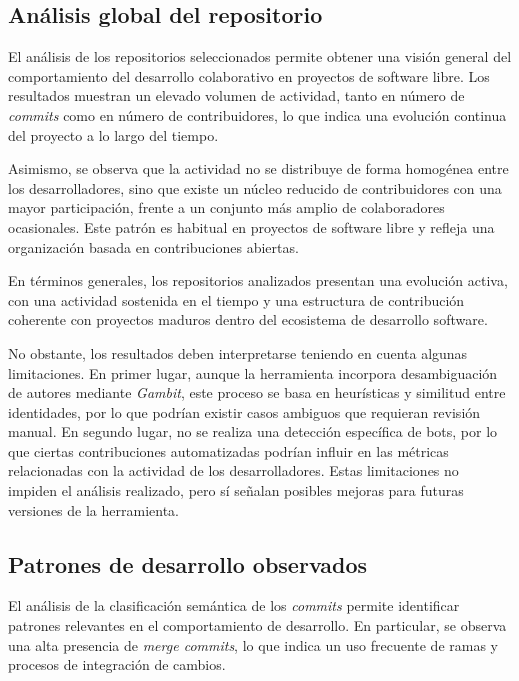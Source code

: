 \documentclass[a4paper, 12pt]{book}
\begin{document}
\subsection{Análisis global del repositorio}
\label{subsec:analisis_global}

El análisis de los repositorios seleccionados permite obtener una visión general del comportamiento del desarrollo colaborativo en proyectos de software libre. Los resultados muestran un elevado volumen de actividad, tanto en número de \emph{commits} como en número de contribuidores, lo que indica una evolución continua del proyecto a lo largo del tiempo.

Asimismo, se observa que la actividad no se distribuye de forma homogénea entre los desarrolladores, sino que existe un núcleo reducido de contribuidores con una mayor participación, frente a un conjunto más amplio de colaboradores ocasionales. Este patrón es habitual en proyectos de software libre y refleja una organización basada en contribuciones abiertas.

En términos generales, los repositorios analizados presentan una evolución activa, con una actividad sostenida en el tiempo y una estructura de contribución coherente con proyectos maduros dentro del ecosistema de desarrollo software.

No obstante, los resultados deben interpretarse teniendo en cuenta algunas limitaciones. En primer lugar, aunque la herramienta incorpora desambiguación de autores mediante \emph{Gambit}, este proceso se basa en heurísticas y similitud entre identidades, por lo que podrían existir casos ambiguos que requieran revisión manual. En segundo lugar, no se realiza una detección específica de bots, por lo que ciertas contribuciones automatizadas podrían influir en las métricas relacionadas con la actividad de los desarrolladores. Estas limitaciones no impiden el análisis realizado, pero sí señalan posibles mejoras para futuras versiones de la herramienta.

\subsection{Patrones de desarrollo observados}
\label{subsec:patrones}

El análisis de la clasificación semántica de los \emph{commits} permite identificar patrones relevantes en el comportamiento de desarrollo. En particular, se observa una alta presencia de \emph{merge commits}, lo que indica un uso frecuente de ramas y procesos de integración de cambios.
\end{document}
